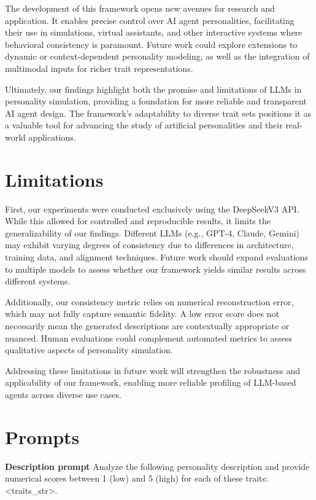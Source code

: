 \documentclass[12pt]{article}
\begin{document}
The development of this framework opens new avenues for research and application. It enables precise control over AI agent personalities, facilitating their use in simulations, virtual assistants, and other interactive systems where behavioral consistency is paramount. Future work could explore extensions to dynamic or context-dependent personality modeling, as well as the integration of multimodal inputs for richer trait representations.  

Ultimately, our findings highlight both the promise and limitations of LLMs in personality simulation, providing a foundation for more reliable and transparent AI agent design. The framework's adaptability to diverse trait sets positions it as a valuable tool for advancing the study of artificial personalities and their real-world applications.


\section{Limitations}
 First, our experiments were conducted exclusively using the DeepSeekV3 API. While this allowed for controlled and reproducible results, it limits the generalizability of our findings. Different LLMs (e.g., GPT-4, Claude, Gemini) may exhibit varying degrees of consistency due to differences in architecture, training data, and alignment techniques. Future work should expand evaluations to multiple models to assess whether our framework yields similar results across different systems.  
  

Additionally, our consistency metric relies on numerical reconstruction error, which may not fully capture semantic fidelity. A low error score does not necessarily mean the generated descriptions are contextually appropriate or nuanced. Human evaluations could complement automated metrics to assess qualitative aspects of personality simulation.  

Addressing these limitations in future work will strengthen the robustness and applicability of our framework, enabling more reliable profiling of LLM-based agents across diverse use cases.




\appendix

\section{Prompts} 
\textbf{Description prompt}\newline
Analyze the following personality description and provide numerical scores between 1 (low) and 5 (high) for each of these traits: <traits\_str>.
\end{document}
